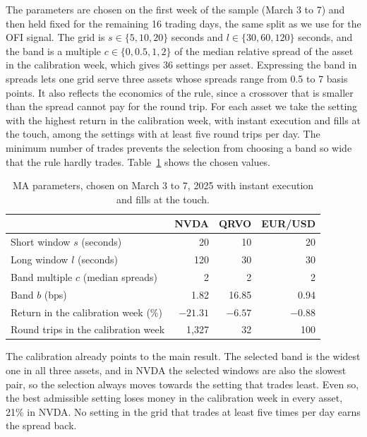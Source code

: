 \documentclass{article}
\begin{document}
\noindent The parameters are chosen on the first week of the sample (March 3 to 7) and then held fixed for the remaining 16 trading days, the same split as we use for the OFI signal. The grid is $s \in \{5, 10, 20\}$ seconds and $l \in \{30, 60, 120\}$ seconds, and the band is a multiple $c \in \{0, 0.5, 1, 2\}$ of the median relative spread of the asset in the calibration week, which gives 36 settings per asset. Expressing the band in spreads lets one grid serve three assets whose spreads range from 0.5 to 7 basis points. It also reflects the economics of the rule, since a crossover that is smaller than the spread cannot pay for the round trip. For each asset we take the setting with the highest return in the calibration week, with instant execution and fills at the touch, among the settings with at least five round trips per day. The minimum number of trades prevents the selection from choosing a band so wide that the rule hardly trades. Table~\ref{tab:ma_params} shows the chosen values.

\begin{table}[H]
\centering
\begin{tabular}{lrrr}
\toprule
 & NVDA & QRVO & EUR/USD \\
\midrule
Short window $s$ (seconds) & 20 & 10 & 20 \\
Long window $l$ (seconds) & 120 & 30 & 30 \\
Band multiple $c$ (median spreads) & 2 & 2 & 2 \\
Band $b$ (bps) & 1.82 & 16.85 & 0.94 \\
\midrule
Return in the calibration week (\%) & $-21.31$ & $-6.57$ & $-0.88$ \\
Round trips in the calibration week & 1,327 & 32 & 100 \\
\bottomrule
\end{tabular}
\caption{MA parameters, chosen on March 3 to 7, 2025 with instant execution and fills at the touch.}
\label{tab:ma_params}
\end{table}

\noindent The calibration already points to the main result. The selected band is the widest one in all three assets, and in NVDA the selected windows are also the slowest pair, so the selection always moves towards the setting that trades least. Even so, the best admissible setting loses money in the calibration week in every asset, 21\% in NVDA. No setting in the grid that trades at least five times per day earns the spread back.\\
\end{document}
